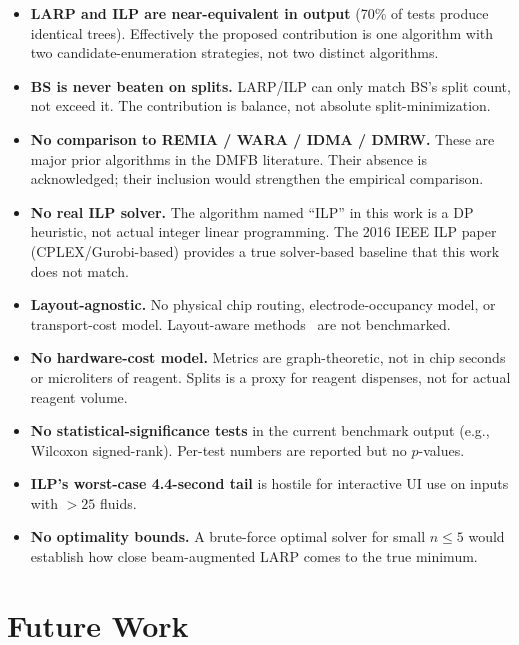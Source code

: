 \begin{itemize}
    \item \textbf{LARP and ILP are near-equivalent in output} (70\% of tests produce identical trees). Effectively the proposed contribution is one algorithm with two candidate-enumeration strategies, not two distinct algorithms.
    
    \item \textbf{BS is never beaten on splits.} LARP/ILP can only match BS's split count, not exceed it. The contribution is balance, not absolute split-minimization.
    
    \item \textbf{No comparison to REMIA / WARA / IDMA / DMRW.} These are major prior algorithms in the DMFB literature. Their absence is acknowledged; their inclusion would strengthen the empirical comparison.
    
    \item \textbf{No real ILP solver.} The algorithm named ``ILP'' in this work is a DP heuristic, not actual integer linear programming. The 2016 IEEE ILP paper~\cite{ilp_ieee2016} (CPLEX/Gurobi-based) provides a true solver-based baseline that this work does not match.
    
    \item \textbf{Layout-agnostic.} No physical chip routing, electrode-occupancy model, or transport-cost model. Layout-aware methods~\cite{bhattacharjee2015layout} are not benchmarked.
    
    \item \textbf{No hardware-cost model.} Metrics are graph-theoretic, not in chip seconds or microliters of reagent. Splits is a proxy for reagent dispenses, not for actual reagent volume.
    
    \item \textbf{No statistical-significance tests} in the current benchmark output (e.g., Wilcoxon signed-rank). Per-test numbers are reported but no $p$-values.
    
    \item \textbf{ILP's worst-case 4.4-second tail} is hostile for interactive UI use on inputs with $> 25$ fluids.
    
    \item \textbf{No optimality bounds.} A brute-force optimal solver for small $n \leq 5$ would establish how close beam-augmented LARP comes to the true minimum.
\end{itemize}

\section{Future Work}

